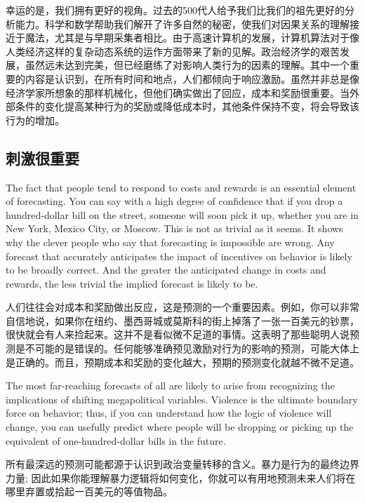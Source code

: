 \begin{Parallel}{97mm}{45mm}
  \ParallelRText
  {幸运的是，我们拥有更好的视角。过去的500代人给予我们比我们的祖先更好的分析能力。科学和数学帮助我们解开了许多自然的秘密，使我们对因果关系的理解接近于魔法，尤其是与早期采集者相比。由于高速计算机的发展，计算机算法对于像人类经济这样的复杂动态系统的运作方面带来了新的见解。政治经济学的艰苦发展，虽然远未达到完美，但已经磨练了对影响人类行为的因素的理解。其中一个重要的内容是认识到，在所有时间和地点，人们都倾向于响应激励。虽然并非总是像经济学家所想象的那样机械化，但他们确实做出了回应，成本和奖励很重要。当外部条件的变化提高某种行为的奖励或降低成本时，其他条件保持不变，将会导致该行为的增加。}
  \ParallelPar

  \subsection{刺激很重要}

  \ParallelLText
  {The fact that people tend to respond to costs and rewards is an essential element of forecasting. You can say with a high degree of confidence that if you drop a hundred-dollar bill on the street, someone will soon pick it up, whether you are in New York, Mexico City, or Moscow. This is not as trivial as it seems. It shows why the clever people who say that forecasting is impossible are wrong. Any forecast that accurately anticipates the impact of incentives on behavior is likely to be broadly correct. And the greater the anticipated change in costs and rewards, the less trivial the implied forecast is likely to be.}
  
  \ParallelRText
  {人们往往会对成本和奖励做出反应，这是预测的一个重要因素。例如，你可以非常自信地说，如果你在纽约、墨西哥城或莫斯科的街上掉落了一张一百美元的钞票，很快就会有人来捡起来。这并不是看似微不足道的事情。这表明了那些聪明人说预测是不可能的是错误的。任何能够准确预见激励对行为的影响的预测，可能大体上是正确的。而且，预期成本和奖励的变化越大，预期的预测变化就越不微不足道。
  }
  \ParallelPar


  \ParallelLText
  {The most far-reaching forecasts of all are likely to arise from recognizing the implications of shifting megapolitical variables. Violence is the ultimate boundary force on behavior; thus, if you can understand how the logic of violence will change, you can usefully predict where people will be dropping or picking up the equivalent of one-hundred-dollar bills in the future.}
  
  \ParallelRText
  {所有最深远的预测可能都源于认识到政治变量转移的含义。暴力是行为的最终边界力量; 因此如果你能理解暴力逻辑将如何变化，你就可以有用地预测未来人们将在哪里弃置或拾起一百美元的等值物品。}
  \ParallelPar




\end{Parallel}
